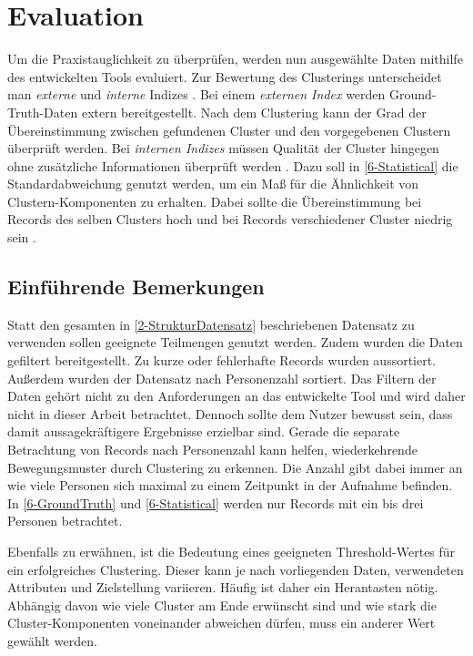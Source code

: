 \chapter{Evaluation}
\label{chapter6}
Um die Praxistauglichkeit zu überprüfen, werden nun ausgewählte Daten
mithilfe des entwickelten Tools evaluiert.
Zur Bewertung des Clusterings unterscheidet man \emph{externe}
und \emph{interne} Indizes \citep{aghabozorgi_time-series_2015, warren_liao_clustering_2005}.
Bei einem \emph{externen Index} werden Ground-Truth-Daten extern bereitgestellt.
Nach dem Clustering kann der Grad der Übereinstimmung zwischen gefundenen Cluster
und den vorgegebenen Clustern überprüft werden.
Bei \emph{internen Indizes} müssen Qualität der Cluster hingegen
ohne zusätzliche Informationen überprüft werden \citep{aghabozorgi_time-series_2015, warren_liao_clustering_2005}.
Dazu soll in \autoref{6-Statistical} die Standardabweichung genutzt werden,
um ein Maß für die Ähnlichkeit von Clustern-Komponenten zu erhalten.
Dabei sollte die Übereinstimmung bei Records des selben Clusters hoch
und bei Records verschiedener Cluster niedrig sein \citep{aghabozorgi_time-series_2015}.

\section{Einführende Bemerkungen}
\label{6-Bemerkungen}
Statt den gesamten in \autoref{2-StrukturDatensatz} beschriebenen Datensatz zu verwenden
sollen geeignete Teilmengen genutzt werden.
Zudem wurden die Daten gefiltert bereitgestellt.
Zu kurze oder fehlerhafte Records wurden aussortiert.
Außerdem wurden der Datensatz nach Personenzahl sortiert.
Das Filtern der Daten gehört nicht zu den Anforderungen an das entwickelte Tool
und wird daher nicht in dieser Arbeit betrachtet.
Dennoch sollte dem Nutzer bewusst sein,
dass damit aussagekräftigere Ergebnisse erzielbar sind.
Gerade die separate Betrachtung von Records nach Personenzahl kann helfen,
wiederkehrende Bewegungsmuster durch Clustering zu erkennen.
Die Anzahl gibt dabei immer an wie viele Personen sich maximal
zu einem Zeitpunkt in der Aufnahme befinden.
In \autoref{6-GroundTruth} und \autoref{6-Statistical} werden nur Records mit ein bis drei Personen betrachtet.

Ebenfalls zu erwähnen, ist die Bedeutung eines geeigneten Threshold-Wertes für ein erfolgreiches Clustering.
Dieser kann je nach vorliegenden Daten, verwendeten Attributen und Zielstellung variieren.
Häufig ist daher ein {\glqq Herantasten\grqq} nötig.
Abhängig davon wie viele Cluster am Ende erwünscht sind
und wie stark die Cluster-Komponenten voneinander abweichen dürfen,
muss ein anderer Wert gewählt werden.

